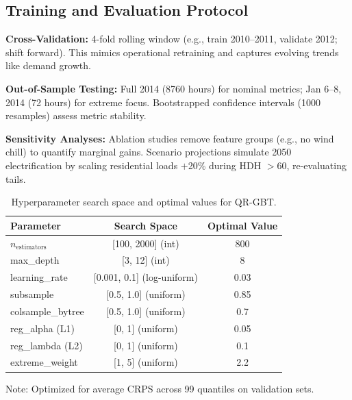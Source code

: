 \documentclass[12pt,a4paper]{article}
\begin{document}
\subsection{Training and Evaluation Protocol}

\textbf{Cross-Validation:} 4-fold rolling window (e.g., train 2010--2011, validate 2012; shift forward). This mimics operational retraining and captures evolving trends like demand growth.

\textbf{Out-of-Sample Testing:} Full 2014 (8760 hours) for nominal metrics; Jan 6--8, 2014 (72 hours) for extreme focus. Bootstrapped confidence intervals (1000 resamples) assess metric stability.

\textbf{Sensitivity Analyses:} Ablation studies remove feature groups (e.g., no wind chill) to quantify marginal gains. Scenario projections simulate 2050 electrification by scaling residential loads $+$20\% during HDH $>$60, re-evaluating tails.

\begin{table}[H]
    \centering
    \caption{Hyperparameter search space and optimal values for QR-GBT.}
    \label{tab:table2}
    \begin{tabular}{lcc}
        \toprule
        \textbf{Parameter} & \textbf{Search Space} & \textbf{Optimal Value} \\
        \midrule
        $n_{\text{estimators}}$ & [100, 2000] (int) & 800 \\
        max\_depth & [3, 12] (int) & 8 \\
        learning\_rate & [0.001, 0.1] (log-uniform) & 0.03 \\
        subsample & [0.5, 1.0] (uniform) & 0.85 \\
        colsample\_bytree & [0.5, 1.0] (uniform) & 0.7 \\
        reg\_alpha (L1) & [0, 1] (uniform) & 0.05 \\
        reg\_lambda (L2) & [0, 1] (uniform) & 0.1 \\
        extreme\_weight & [1, 5] (uniform) & 2.2 \\
        \bottomrule
    \end{tabular}
    \par\medskip\footnotesize
    Note: Optimized for average CRPS across 99 quantiles on validation sets.
\end{table}
\end{document}
